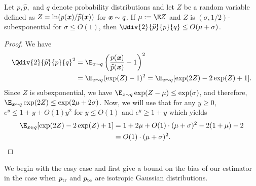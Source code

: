 \begin{lemma}
    \label{lem:q_log_subexp}Let  $p,\widehat{p},$ and $q$ denote probability distributions and
    let $Z$ be a random variable defined as $Z = \ln (p(\boldsymbol{\mathit{x}})/\widehat{p}(\boldsymbol{\mathit{x}}))$ for $\boldsymbol{\mathit{x}}\sim q$. If $\mu := \E Z$ and $Z$ is $(\sigma, 1/2)$-subexponential for $\sigma \leq O(1)$, then $\Qdiv{2}{\widehat{p}}{p}{q} \leq O(\mu + \sigma)$.
\end{lemma}
\begin{proof}
    We have
    \begin{align*}
        \Qdiv{2}{\widehat{p}}{p}{q}^2 & = \E_{\xx\sim q} \left( \frac{p(\xx)}{\widehat{p}(\xx)} - 1\right)^2 \\
        & = \E_{\xx\sim q} (\exp(Z) - 1)^2 = \E_{\xx\sim q} [\exp(2Z) - 2\exp(Z) +1 ].
    \end{align*}
    Since $Z$ is subexponential, we have $\E_{\xx\sim q}\exp(Z-\mu) \leq \exp( \sigma)$, and therefore, $\E_{\xx\sim q} \exp(2Z) \leq \exp(2 \mu + 2\sigma)$. Now, we will use that for any $y\geq 0$, $e^y \leq 1+y+O(1)y^2$ for $y\leq O(1)$ and $e^y \geq 1+y$ which yields
    \begin{align*}
        \E_{\xx\in q}[\exp(2Z) - 2\exp(Z) + 1] & = 1 + 2 \mu + O(1)\cdot(\mu+\sigma)^2 - 2(1 + \mu) - 2 \\
        & = O(1)\cdot (\mu + \sigma)^2.
    \end{align*}
\end{proof}

We begin with the easy case and first give a bound on the bias of our estimator in the case when $p_{\mathrm{tr}}$ and $p_{\mathrm{te}}$ are isotropic Gaussian distributions.

\IsoGaussBias*

